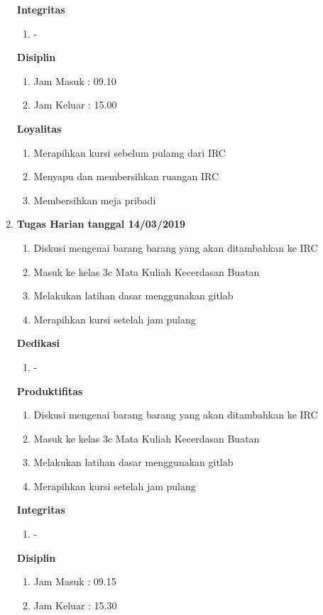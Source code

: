 \begin{enumerate}
\textbf{Integritas}
\begin{enumerate}
\item -
\end{enumerate}


\textbf{Disiplin}
\begin{enumerate}
\item Jam Masuk : 09.10
\item Jam Keluar : 15.00
\end{enumerate}


\textbf{Loyalitas}
\begin{enumerate}
\item Merapihkan kursi sebelum pulamg dari IRC
\item Menyapu dan membersihkan ruangan IRC
\item Membersihkan meja pribadi
\end{enumerate}

\item \textbf{Tugas Harian tanggal 14/03/2019}
\begin{enumerate}
\item Diskusi mengenai barang barang yang akan ditambahkan ke IRC
\item Masuk ke kelas 3c Mata Kuliah Kecerdasan Buatan
\item Melakukan latihan dasar menggunakan gitlab
\item Merapihkan kursi setelah jam pulang
\end{enumerate}

\textbf{Dedikasi}
\begin{enumerate}
\item -
\end{enumerate}

\textbf{Produktifitas}
\begin{enumerate}
\item Diskusi mengenai barang barang yang akan ditambahkan ke IRC
\item Masuk ke kelas 3c Mata Kuliah Kecerdasan Buatan
\item Melakukan latihan dasar menggunakan gitlab
\item Merapihkan kursi setelah jam pulang
\end{enumerate}

\textbf{Integritas}
\begin{enumerate}
\item -
\end{enumerate}

\textbf{Disiplin}
\begin{enumerate}
\item Jam Masuk : 09.15
\item Jam Keluar : 15.30
\end{enumerate}


\end{enumerate}
